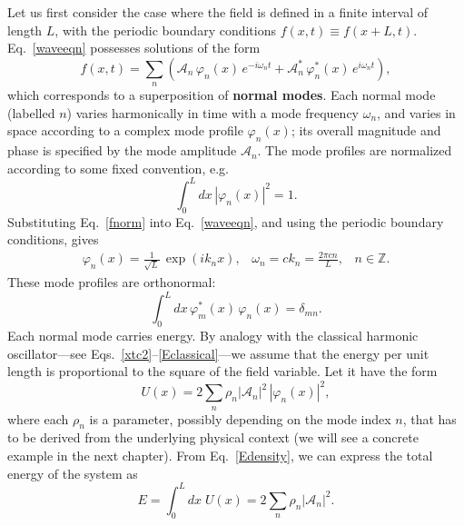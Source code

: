 \documentclass[prx,12pt]{revtex4-2}
\begin{document}
Let us first consider the case where the field is defined in a finite
interval of length $L$, with the periodic boundary conditions $f(x,t)
\equiv f(x+L, t)$.  Eq.~\eqref{waveeqn} possesses solutions of the
form
\begin{equation}
  f(x,t) = \sum_n \left( \mathcal{A}_n\, \varphi_n(x) \, e^{-i\omega_n t}
  + \mathcal{A}_n^*\, \varphi_n^*(x) \, e^{i\omega_n t}\right),
  \label{fnorm}
\end{equation}
which corresponds to a superposition of \textbf{normal modes}.  Each
normal mode (labelled $n$) varies harmonically in time with a mode
frequency $\omega_n$, and varies in space according to a complex mode
profile $\varphi_n(x)$; its overall magnitude and phase is specified
by the mode amplitude $\mathcal{A}_n$.  The mode profiles are
normalized according to some fixed convention, e.g.
\begin{equation}
  \int_0^L dx \, |\varphi_n(x)|^2 = 1.
\end{equation}
Substituting Eq.~\eqref{fnorm} into Eq.~\eqref{waveeqn}, and using the
periodic boundary conditions, gives
\begin{align}
  \varphi_n(x) = \frac{1}{\sqrt{L}}\, \exp\left(ik_n x\right), \;\;\;
  \omega_n = c k_n = \frac{2\pi c n}{L}, \;\;\; n \in \mathbb{Z}.
  \label{classical_modes}
\end{align}
These mode profiles are orthonormal:
\begin{equation}
  \int_0^L dx \, \varphi_m^*(x) \, \varphi_n(x) = \delta_{mn}.
\end{equation}
Each normal mode carries energy.  By analogy with the classical
harmonic oscillator---see Eqs.~\eqref{xtc2}--\eqref{Eclassical}---we
assume that the energy per unit length is proportional to the square
of the field variable.  Let it have the form
\begin{equation}
  U(x) = 2 \sum_n \rho_n |\mathcal{A}_n|^2 \, |\varphi_n(x)|^2,
  \label{Edensity}
\end{equation}
where each $\rho_n$ is a parameter, possibly depending on the mode
index $n$, that has to be derived from the underlying physical context
(we will see a concrete example in the next chapter).  From
Eq.~\eqref{Edensity}, we can express the total energy of the system as
\begin{equation}
  E = \int_0^L dx \; U(x) = 2 \sum_n \rho_n |\mathcal{A}_n|^2.
  \label{classical_energy}
\end{equation}
\end{document}
